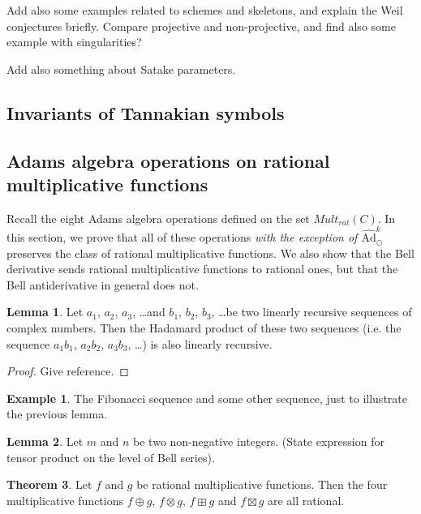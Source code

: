 \documentclass[a4paper]{article}
\theoremstyle{definition}
\newtheorem{theorem}{Theorem}[section]
\newtheorem{example}{Example}[section]
\newtheorem{lemma}[theorem]{Lemma}
\theoremstyle{remark}
\newcommand{\hatadam}[1]{\widehat{\text{Ad}}^{#1}_{\bigcirc}}
\begin{document}
Add also some examples related to schemes and skeletons, and explain the Weil conjectures briefly. Compare projective and non-projective, and find also some example with singularities?

Add also something about Satake parameters.


\subsection{Invariants of Tannakian symbols}





\subsection{Adams algebra operations on rational multiplicative functions}

Recall the eight Adams algebra operations defined on the set $Mult_{rat}(C)$. In this section, we prove that all of these operations \emph{with the exception of $\hatadam{k}$} preserves the class of rational multiplicative functions. We also show that the Bell derivative sends rational multiplicative functions to rational ones, but that the Bell antiderivative in general does not.

\begin{lemma}
Let $a_1$, $a_2$, $a_3$, \ldots and $b_1$, $b_2$, $b_3$, \ldots be two linearly recursive sequences of complex numbers. Then the Hadamard product of these two sequences (i.e. the sequence $a_1 b_1$, $a_2 b_2$, $a_3 b_3$, \ldots) is also linearly recursive.
\end{lemma}
\begin{proof}
Give reference.
\end{proof}

\begin{example}
The Fibonacci sequence and some other sequence, just to illustrate the previous lemma. 
\end{example}

\begin{lemma}
Let $m$ and $n$ be two non-negative integers. (State expression for tensor product on the level of Bell series).
\end{lemma}

\begin{theorem}

Let $f$ and $g$ be rational multiplicative functions. Then the four multiplicative functions $f \oplus g$, $f \otimes g$, $f \boxplus g$ and $f \boxtimes g$ are all rational.
\end{theorem}
\end{document}
